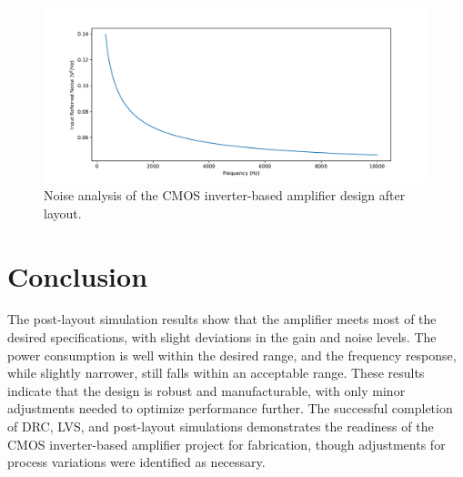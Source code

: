 \begin{figure}[ht!]
    \centering
    \includegraphics[width=\textwidth]{Figures/inoise_pl.pdf}
    \caption{Noise analysis of the CMOS inverter-based amplifier design after layout.}
    \label{fig:post_layout_noise}
\end{figure}

\section{Conclusion}
The post-layout simulation results show that the amplifier meets most of the desired specifications, with slight deviations in the gain and noise levels. 
The power consumption is well within the desired range, and the frequency response, while slightly narrower, still falls within an acceptable range. 
These results indicate that the design is robust and manufacturable, with only minor adjustments needed to optimize performance further. 
The successful completion of DRC, LVS, and post-layout simulations demonstrates the readiness of the CMOS inverter-based amplifier project for fabrication, though adjustments for process variations were identified as necessary. 